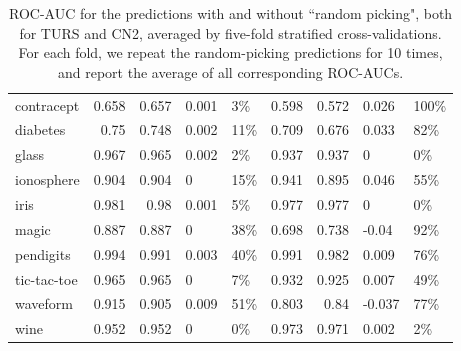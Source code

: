 \begin{table}[ht]
\begin{tabular}{l|rrll|rrll}
  contracept & 0.658 & 0.657 & 0.001 & 3\% & 0.598 & 0.572 & 0.026 & 100\% \\ 
  diabetes & 0.75 & 0.748 & 0.002 & 11\% & 0.709 & 0.676 & 0.033 & 82\% \\ 
  glass & 0.967 & 0.965 & 0.002 & 2\% & 0.937 & 0.937 & 0 & 0\% \\ 
  ionosphere & 0.904 & 0.904 & 0 & 15\% & 0.941 & 0.895 & 0.046 & 55\% \\ 
  iris & 0.981 & 0.98 & 0.001 & 5\% & 0.977 & 0.977 & 0 & 0\% \\ 
  magic & 0.887 & 0.887 & 0 & 38\% & 0.698 & 0.738 & -0.04 & 92\% \\ 
  pendigits & 0.994 & 0.991 & 0.003 & 40\% & 0.991 & 0.982 & 0.009 & 76\% \\ 
  tic-tac-toe & 0.965 & 0.965 & 0 & 7\% & 0.932 & 0.925 & 0.007 & 49\% \\ 
  waveform & 0.915 & 0.905 & 0.009 & 51\% & 0.803 & 0.84 & -0.037 & 77\% \\ 
  wine & 0.952 & 0.952 & 0 & 0\% & 0.973 & 0.971 & 0.002 & 2\% \\ 
  \hline
  \end{tabular}
\caption{ROC-AUC for the predictions with and without ``random picking", both for TURS and CN2, averaged by five-fold stratified cross-validations. For each fold, we repeat the random-picking predictions for 10 times, and report the average of all corresponding ROC-AUCs. } \label{table:roc_auc_rp}
\end{table}
